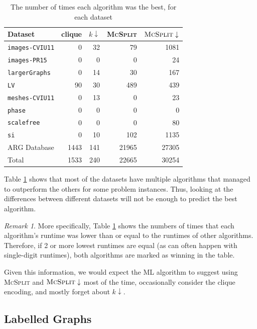 \documentclass{l4proj}
\theoremstyle{definition}
\theoremstyle{remark}
\newtheorem{remark}{Remark}[chapter]
\begin{document}
\begin{table}
  \centering
  \begin{tabular}{l r r r r}
    Dataset & clique & $k\downarrow$ & \textsc{McSplit} & $\textsc{McSplit}\downarrow$ \\
    \hline
    \texttt{images-CVIU11} & 0 & 32 & 79 & 1081 \\
    \texttt{images-PR15} & 0 & 0 & 0 & 24 \\
    \texttt{largerGraphs} & 0 & 14 & 30 & 167 \\
    \texttt{LV} & 90 & 30 & 489 & 439 \\
    \texttt{meshes-CVIU11} & 0 & 13 & 0 & 23 \\
    \texttt{phase} & 0 & 0 & 0 & 0 \\
    \texttt{scalefree} & 0 & 0 & 0 & 80 \\
    \texttt{si} & 0 & 10 & 102 & 1135 \\
    ARG Database & 1443 & 141 & 21965 & 27305 \\
    \hline
    Total & 1533 & 240 & 22665 & 30254
  \end{tabular}
  \caption{The number of times each algorithm was the best, for each dataset}
  \label{table:best}
\end{table}

Table \ref{table:best} shows that most of the datasets have multiple algorithms
that managed to outperform the others for some problem instances. Thus, looking
at the differences between different datasets will not be enough to predict the
best algorithm.

\begin{remark}
  More specifically, Table \ref{table:best} shows the numbers of times that each
  algorithm's runtime was lower than or equal to the runtimes of other algorithms.
  Therefore, if 2 or more lowest runtimes are equal (as can often happen with
  single-digit runtimes), both algorithms are marked as winning in the table.
\end{remark}

Given this information, we would expect the ML algorithm to suggest using
\textsc{McSplit} and $\textsc{McSplit}\downarrow$ most of the time, occasionally
consider the clique encoding, and mostly forget about $k\downarrow$.

\subsection{Labelled Graphs} \label{sec:labelled_runtimes}
\end{document}
